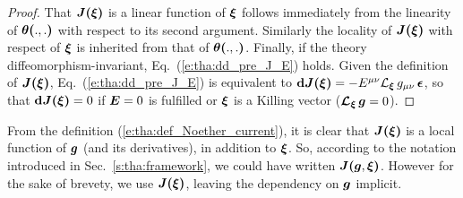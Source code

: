 \begin{proof}
That $\bm{J}\textbf{(}\bm{\xi}\textbf{)}$ is a linear function of $\bm{\xi}$ follows immediately from
the linearity of $\bm{\theta}\textbf{(} .,.\textbf{)}$ with respect to its second argument. Similarly the
locality of $\bm{J}\textbf{(}\bm{\xi}\textbf{)}$ with respect of $\bm{\xi}$ is inherited from
that of $\bm{\theta}\textbf{(} .,.\textbf{)}$.
Finally, if the theory diffeomorphism-invariant, Eq.~(\ref{e:tha:dd_pre_J_E}) holds. Given the
definition of $\bm{J}\textbf{(}\bm{\xi}\textbf{)}$, Eq.~(\ref{e:tha:dd_pre_J_E}) is equivalent to
$\mathbf{d}\bm{J}\textbf{(}\bm{\xi}\textbf{)}  = - E^{\mu\nu} {\mathcal{L}}_{\bm{\xi}}\, g_{\mu\nu} \,\bm{\epsilon}$,
so that $\mathbf{d}\bm{J}\textbf{(}\bm{\xi}\textbf{)}  = 0$ if $\bm{E} = 0$ is fulfilled or $\bm{\xi}$ is a Killing vector
($\bm{\mathcal{L}}_{\bm{\xi}}\,\bm{g} = 0$).
\end{proof}

\begin{remark}
\label{r:tha:notation_J}
From the definition (\ref{e:tha:def_Noether_current}), it is clear that
$\bm{J}\textbf{(}\bm{\xi}\textbf{)}$ is a local function of $\bm{g}$ (and its derivatives), in addition to $\bm{\xi}$. So, according to the notation introduced in Sec.~\ref{s:tha:framework}, we could have written
$\bm{J}\textbf{(}\bm{g},\bm{\xi}\textbf{)}$. However for the sake of brevety, we use
$\bm{J}\textbf{(}\bm{\xi}\textbf{)}$, leaving the dependency on $\bm{g}$ implicit.
\end{remark}

